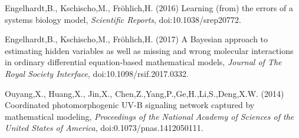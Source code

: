 \documentclass{bioinfo}
\begin{document}
\begin{thebibliography}{}

Engelhardt,B., Kschischo,M., Fr\"ohlich,H. (2016) Learning (from) the errors of a systems biology model, {\it Scientific Reports},
doi:10.1038/srep20772.

Engelhardt,B., Kschischo,M., Fr\"ohlich,H. (2017) A Bayesian approach to estimating hidden variables as well as missing and wrong 
molecular interactions in ordinary differential equation-based mathematical models, {\it Journal of The Royal Society Interface},
doi:10.1098/rsif.2017.0332.

Ouyang,X., Huang,X., Jin,X., Chen,Z.,Yang,P.,Ge,H.,Li,S.,Deng,X.W. (2014) Coordinated photomorphogenic UV-B signaling network captured by mathematical modeling, {\it Proceedings of the National Academy of Sciences of the United States of America},
doi:0.1073/pnas.1412050111.


\end{thebibliography}
\end{document}
